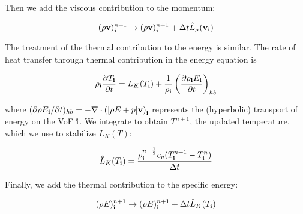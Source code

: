 \noindent
Then we add the viscous contribution to the momentum:

\begin{equation}
(\rho\mathbf{v})^{n+1}_{\bf i} \rightarrow (\rho\mathbf{v})^{n+1}_{\bf i} + \Delta t \hat{L}_\mu(\mathbf{v}_{\bf i}) \label{eq:viscUpdate}
\end{equation}

The treatment of the thermal contribution to the energy is similar. The 
rate of heat transfer through thermal contribution in the energy equation is

\begin{equation}
\rho_{\bf i}\frac{\partial T_{\bf i}}{\partial t} = L_K(T_{\bf i}) + \frac{1}{\rho_{\bf i}}\left(\frac{\partial \rho_{\bf i} E_{\bf i}}{\partial t}\right)_{hb} \label{eq:thermContrib}
\end{equation}

\noindent
where $(\partial \rho E_{\bf i}/\partial t)_{hb} = -\nabla\cdot{([\rho E + p]\mathbf{v})}_{\bf i}$ 
represents the (hyperbolic) transport of energy on the VoF ${\bf i}$. We integrate
 to obtain $T^{n+1}$, the updated temperature, which we 
use to stabilize $L_K(T)$:

\begin{equation}
\hat{L}_K(T_{\bf i}) = \frac{\rho^{n+\frac{1}{2}}_{\bf i} c_v (T^{n+1}_{\bf i} - T^n_{\bf i})}{\Delta t} \label{eq:stableLK}
\end{equation}

\noindent
Finally, we add the thermal contribution to the specific energy:

\begin{equation}
(\rho E)^{n+1}_{\bf i} \rightarrow (\rho E)^{n+1}_{\bf i} + \Delta t \hat{L}_K(T_{\bf i}) \label{eq:thermUpdate}
\end{equation}
